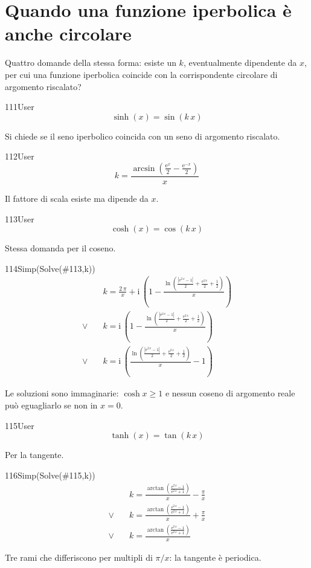 \section{Quando una funzione iperbolica è anche circolare}

Quattro domande della stessa forma: esiste un $k$, eventualmente dipendente da $x$, per cui una funzione iperbolica coincide con la corrispondente circolare di argomento riscalato?

\begin{espr}{111}{User}{}
\[
\sinh\!\left(x\right) = \sin\!\left(k\, x\right)
\]
\end{espr}
Si chiede se il seno iperbolico coincida con un seno di argomento riscalato.

\begin{espr}{112}{User}{}
\[
k = \frac{\arcsin\!\left(\frac{\mathrm{e}^{x}}{2} - \frac{\mathrm{e}^{-x}}{2}\right)}{x}
\]
\end{espr}
Il fattore di scala esiste ma dipende da $x$.

\begin{espr}{113}{User}{}
\[
\cosh\!\left(x\right) = \cos\!\left(k\, x\right)
\]
\end{espr}
Stessa domanda per il coseno.

\begin{espr}{114}{Simp(Solve(\#113,k))}{}
\begin{align*}
& k = \frac{2\, \pi}{x} + \mathrm{i}\, \left(1 - \frac{\ln\!\left(\frac{\left|\mathrm{e}^{2\, x} - 1\right|}{2} + \frac{\mathrm{e}^{2\, x}}{2} + \frac{1}{2}\right)}{x}\right) \\[3pt]
\lor\quad & k = \mathrm{i}\, \left(1 - \frac{\ln\!\left(\frac{\left|\mathrm{e}^{2\, x} - 1\right|}{2} + \frac{\mathrm{e}^{2\, x}}{2} + \frac{1}{2}\right)}{x}\right) \\[3pt]
\lor\quad & k = \mathrm{i}\, \left(\frac{\ln\!\left(\frac{\left|\mathrm{e}^{2\, x} - 1\right|}{2} + \frac{\mathrm{e}^{2\, x}}{2} + \frac{1}{2}\right)}{x} - 1\right)
\end{align*}
\end{espr}
Le soluzioni sono immaginarie: $\cosh x\geq1$ e nessun coseno di argomento reale può eguagliarlo se non in $x=0$.

\begin{espr}{115}{User}{}
\[
\tanh\!\left(x\right) = \tan\!\left(k\, x\right)
\]
\end{espr}
Per la tangente.

\begin{espr}{116}{Simp(Solve(\#115,k))}{}
\begin{align*}
& k = \frac{\arctan\!\left(\frac{\mathrm{e}^{2\, x} - 1}{\mathrm{e}^{2\, x} + 1}\right)}{x} - \frac{\pi}{x} \\[3pt]
\lor\quad & k = \frac{\arctan\!\left(\frac{\mathrm{e}^{2\, x} - 1}{\mathrm{e}^{2\, x} + 1}\right)}{x} + \frac{\pi}{x} \\[3pt]
\lor\quad & k = \frac{\arctan\!\left(\frac{\mathrm{e}^{2\, x} - 1}{\mathrm{e}^{2\, x} + 1}\right)}{x}
\end{align*}
\end{espr}
Tre rami che differiscono per multipli di $\pi/x$: la tangente è periodica.

